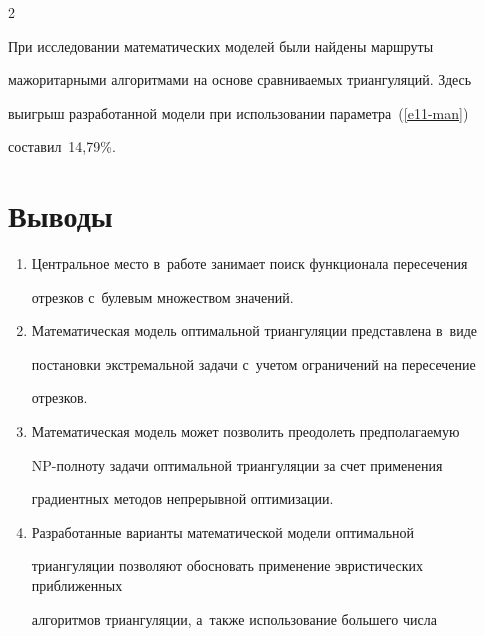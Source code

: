 \begin{multicols}{2}
  


  При исследовании математических моделей были найдены марш\-ру\-ты 


мажоритарными алгоритмами на основе сравниваемых триангуляций. Здесь 


выигрыш разработанной модели при использовании па\-ра\-мет\-ра~(\ref{e11-man}) 


со\-ста\-вил~14,79\%.


  





\vspace*{-6pt}


   


  





\section{Выводы}





\noindent


\begin{enumerate}[1.]


\item Центральное место в~работе занимает поиск функционала пересечения 


отрезков с~булевым множеством значений.


\item Математическая модель оптимальной триангуляции пред\-став\-ле\-на в~виде 


по\-ста\-нов\-ки экстремальной задачи с~учетом ограничений на пересечение 


отрезков.


\item Математическая модель может позволить преодолеть пред\-по\-ла\-га\-емую 


NP-пол\-но\-ту задачи оптимальной триангуляции за счет применения 


градиентных методов непрерывной оптимизации.


\item Разработанные варианты математической модели оптимальной 


триангуляции позволяют обосно\-вать применение эвристических приближенных 


алгоритмов триангуляции, а~так\-же использование большего чис\-ла 



\end{enumerate}
\end{multicols}
